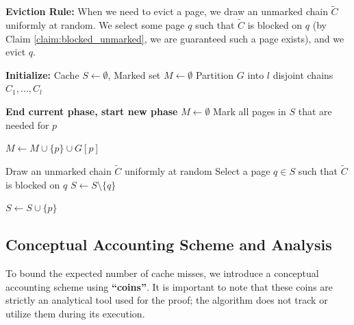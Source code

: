 \documentclass[a4paper]{article}
\begin{document}
\noindent\textbf{Eviction Rule:}
When we need to evict a page, we draw an unmarked chain $\tilde{C}$ uniformly at random. We select some page $q$ such that $\tilde{C}$ is blocked on $q$ (by Claim \ref{claim:blocked_unmarked}, we are guaranteed such a page exists), and we evict $q$. 

\begin{algorithm}
\caption{Randomized Marking Algorithm for Dependency Paging}
\label{alg:randomized_mark_dep_paging}
\begin{algorithmic}[1]
\State \textbf{Initialize:} Cache $S \gets \emptyset$, Marked set $M \gets \emptyset$
\State Partition $G$ into $l$ disjoint chains $C_1, \ldots, C_l$ 

    
     
        \State \textbf{End current phase, start new phase}
        \State $M \gets \emptyset$ 
        \State Mark all pages in $S$ that are needed for $p$
    \EndIf
    
    \State $M \gets M \cup \{p\} \cup G[p]$ 
    
     
        \State Draw an unmarked chain $\tilde{C}$ uniformly at random
        \State Select a page $q \in S$ such that $\tilde{C}$ is blocked on $q$ 
        \State {}
        \State $S \gets S \setminus \{q\}$ 
    \EndIf
    
        \State $S \gets S \cup \{p\}$ 
    \EndIf
\EndFor
\end{algorithmic}
\end{algorithm}

\subsection{Conceptual Accounting Scheme and Analysis}
To bound the expected number of cache misses, we introduce a conceptual accounting scheme using \textbf{``coins''}. It is important to note that these coins are strictly an analytical tool used for the proof; the algorithm does not track or utilize them during its execution.
\end{document}
